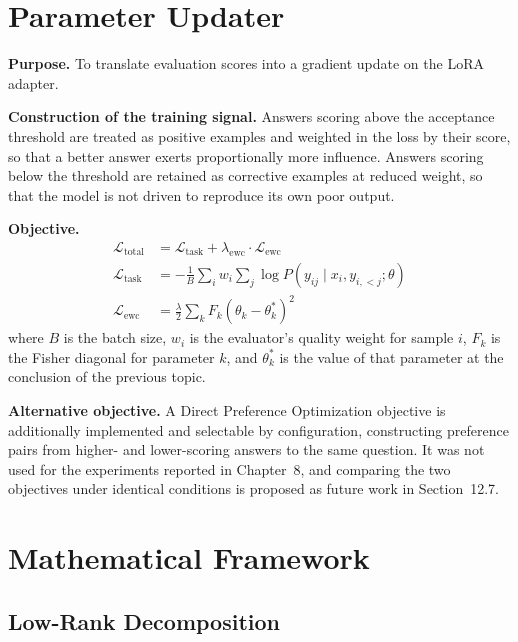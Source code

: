 \documentclass[12pt,a4paper]{report}
\begin{document}
\section{Parameter Updater}

\textbf{Purpose.} To translate evaluation scores into a gradient update on the LoRA adapter.

\textbf{Construction of the training signal.} Answers scoring above the acceptance threshold are treated as positive examples and weighted in the loss by their score, so that a better answer exerts proportionally more influence. Answers scoring below the threshold are retained as corrective examples at reduced weight, so that the model is not driven to reproduce its own poor output.

\textbf{Objective.}
\begin{align}
\mathcal{L}_{\text{total}} &= \mathcal{L}_{\text{task}} + \lambda_{\text{ewc}} \cdot \mathcal{L}_{\text{ewc}} \\
\mathcal{L}_{\text{task}} &= -\frac{1}{B} \sum_i w_i \sum_j \log P(y_{ij} \mid x_i, y_{i,<j}; \theta) \\
\mathcal{L}_{\text{ewc}} &= \frac{\lambda}{2} \sum_k F_k (\theta_k - \theta^*_k)^2
\end{align}
where $B$ is the batch size, $w_i$ is the evaluator's quality weight for sample $i$, $F_k$ is the Fisher diagonal for parameter $k$, and $\theta^*_k$ is the value of that parameter at the conclusion of the previous topic.

\textbf{Alternative objective.} A Direct Preference Optimization objective is additionally implemented and selectable by configuration, constructing preference pairs from higher- and lower-scoring answers to the same question. It was not used for the experiments reported in Chapter~8, and comparing the two objectives under identical conditions is proposed as future work in Section~12.7.

\section{Mathematical Framework}

\subsection{Low-Rank Decomposition}
\end{document}
